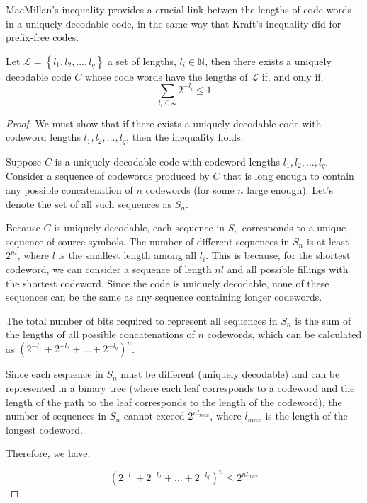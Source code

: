 MacMillan's inequality provides a crucial link betwen the lengths of code words in a uniquely decodable code, in the same way that Kraft's inequality did for prefix-free codes.

\begin{theorem}
\label{th:Kraft-Inequality}
Let $\mathcal{L}=\left\{ l_{1},l_{2},\ldots,l_{q}\right\}$ a set of lengths, $l_{i}\in\mathbb{N}$, then there exists a uniquely decodable code $C$ whose code words have the lengths of $\mathcal{L}$ if, and only if,
\[
\sum_{l_{i}\in\mathcal{L}}2^{-l_{i}} \leq 1
\]
\end{theorem}
\begin{proof}
We must show that if there exists a uniquely decodable code with codeword lengths \( l_1, l_2, \ldots, l_q \), then the inequality holds.

Suppose \( C \) is a uniquely decodable code with codeword lengths \( l_1, l_2, \ldots, l_q \). Consider a sequence of codewords produced by \( C \) that is long enough to contain any possible concatenation of \( n \) codewords (for some \( n \) large enough). Let's denote the set of all such sequences as \( S_n \). 

Because \( C \) is uniquely decodable, each sequence in \( S_n \) corresponds to a unique sequence of source symbols. The number of different sequences in \( S_n \) is at least \( 2^{nl} \), where \( l \) is the smallest length among all \( l_i \). This is because, for the shortest codeword, we can consider a sequence of length \( nl \) and all possible fillings with the shortest codeword. Since the code is uniquely decodable, none of these sequences can be the same as any sequence containing longer codewords.

The total number of bits required to represent all sequences in \( S_n \) is the sum of the lengths of all possible concatenations of \( n \) codewords, which can be calculated as \( (2^{-l_1} + 2^{-l_2} + \ldots + 2^{-l_q})^n \).

Since each sequence in \( S_n \) must be different (uniquely decodable) and can be represented in a binary tree (where each leaf corresponds to a codeword and the length of the path to the leaf corresponds to the length of the codeword), the number of sequences in \( S_n \) cannot exceed \( 2^{nl_{max}} \), where \( l_{max} \) is the length of the longest codeword.

Therefore, we have:

\[
(2^{-l_1} + 2^{-l_2} + \ldots + 2^{-l_q})^n \leq 2^{nl_{max}}
\]


\end{proof}
